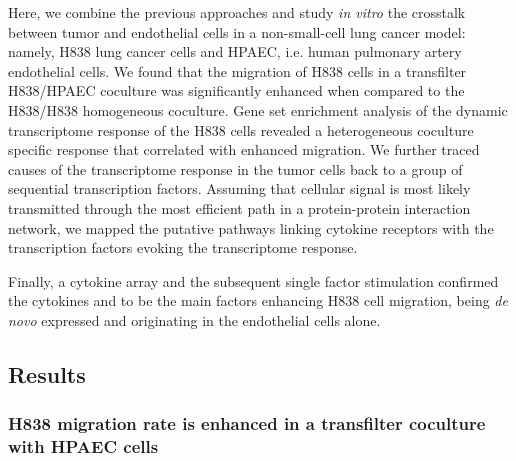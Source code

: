 Here, we combine the previous approaches and
study \emph{in vitro} the crosstalk between tumor and 
endothelial cells in  a non-small-cell lung cancer model: namely,
H838 lung cancer cells and HPAEC, i.e. human pulmonary artery endothelial cells.
We found that the  migration of  H838 cells in a transfilter H838/HPAEC coculture
was significantly enhanced when compared to the H838/H838
homogeneous coculture.
Gene set enrichment analysis of the dynamic transcriptome
response of the H838 cells  revealed a heterogeneous 
coculture specific response 
that correlated with enhanced migration.
We further 
traced causes of the transcriptome response in the tumor cells back to 
a group of sequential transcription factors.
Assuming that cellular signal is most likely transmitted through the most efficient 
path in a protein-protein interaction network, we 
mapped the putative pathways linking cytokine receptors with the 
transcription factors evoking the transcriptome response. 

Finally, a cytokine array and the subsequent single factor 
stimulation
confirmed the cytokines \tnfa and \sdfonea
to be the main factors enhancing H838 cell migration,
being \emph{de novo} expressed and originating in the endothelial cells alone. 




\subsection{Results}

\subsubsection{H838 migration rate is enhanced in a transfilter coculture with HPAEC cells}

